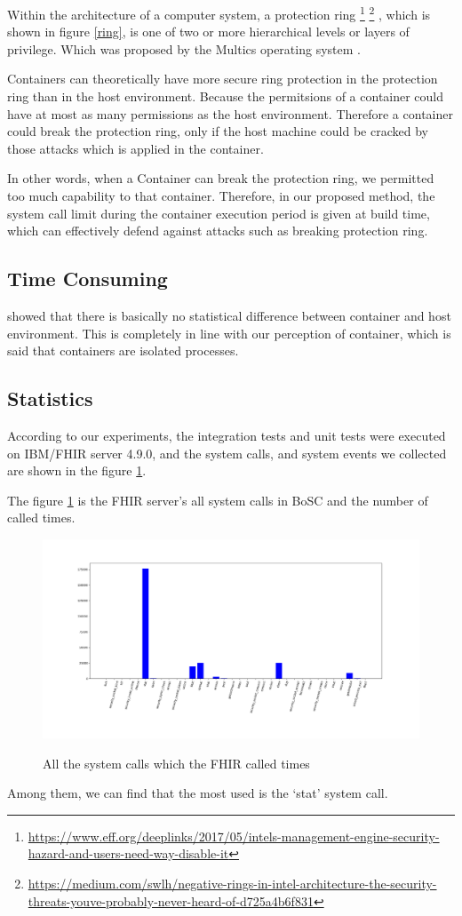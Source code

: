 Within the architecture of a computer system, a protection ring
\footnote{\url{https://www.eff.org/deeplinks/2017/05/intels-management-engine-security-hazard-and-users-need-way-disable-it}}
\footnote{\url{https://medium.com/swlh/negative-rings-in-intel-architecture-the-security-threats-youve-probably-never-heard-of-d725a4b6f831}}
, which is shown in figure \ref{ring}, is one of two or more
hierarchical levels or layers of privilege. Which was proposed by the Multics 
operating system \cite{6234805}.

Containers can theoretically have more secure ring protection in the
protection ring than in the host environment. Because the permitsions
of a container could have at most as many permissions as the host environment.
Therefore a container could break the protection ring, only if the host
machine could be cracked by those attacks which is applied in the container.

In other words, when a Container can break the protection ring, we permitted
too much capability to that container. Therefore, in our proposed method, the
system call limit during the container execution period is given at build time,
which can effectively defend against attacks such as breaking protection ring.

\subsection{Time Consuming}
\textcite{KOZHIRBAYEV2017175} showed that there is basically no
statistical difference between container and host environment.
This is completely in line with our perception of container, 
which is said that containers are isolated processes.

\subsection{Statistics}
According to our experiments, the integration tests and unit
tests were executed on IBM/FHIR server 4.9.0, and the system calls,
and system events we collected are shown in the figure \ref{hist}.

The figure \ref{hist} is the FHIR server's all system calls in
BoSC\cite{1495942} and the number of called times.
\begin{figure}
    \centering
    \includegraphics[width=\textwidth]{src/hist.png}
    \label{hist}
    \caption{All the system calls which the FHIR called times}
\end{figure}
Among them, we can find that the most used is the `stat' system call.


